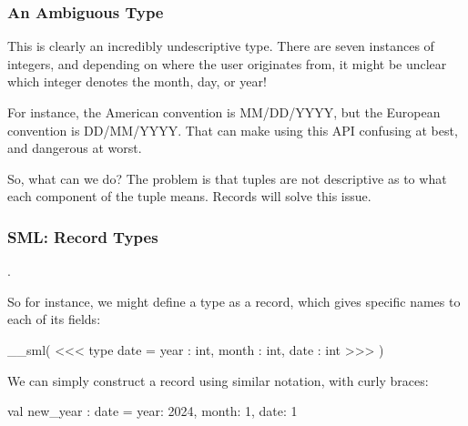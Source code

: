 \documentclass[aspectratio=169, handout]{beamer}
\begin{document}
\begin{frame}[fragile]
  \frametitle{An Ambiguous Type}

  This is clearly an incredibly undescriptive type. There are seven instances of
  integers, and depending on where the user originates from, it might be unclear
  which integer denotes the month, day, or year!

  \vspace{\fill}

  For instance, the American convention is MM/DD/YYYY, but the European convention
  is DD/MM/YYYY. That can make using this API confusing at best, and dangerous
  at worst.

  \vspace{\fill}

  So, what can we do? The problem is that tuples are not descriptive as to what
  each component of the tuple means. Records will solve this issue.
\end{frame}

\begin{frame}[fragile]
  \frametitle{SML: Record Types}

  .

  \vspace{\fill}

  So for instance, we might define a  type as a record, which gives
  specific names to each of its fields:

  \vspace{10pt}

__sml(
<<<
  type date = {
    year  : int,
    month : int,
    date  : int
  }
>>>
)

  \vspace{\fill}

  We can simply construct a record using similar notation, with curly braces:

  \vspace{\fill}

  \begin{codeblock}
    val new_year : date = { year: 2024, month: 1, date: 1 }
  \end{codeblock}
\end{frame}
\end{document}
